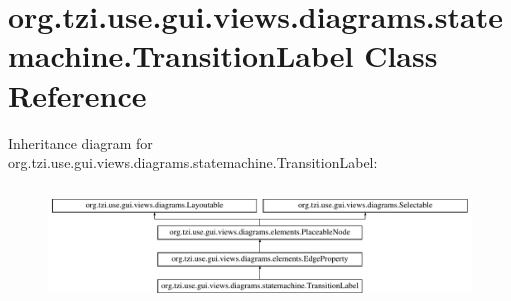 \hypertarget{classorg_1_1tzi_1_1use_1_1gui_1_1views_1_1diagrams_1_1statemachine_1_1_transition_label}{\section{org.\-tzi.\-use.\-gui.\-views.\-diagrams.\-statemachine.\-Transition\-Label Class Reference}
\label{classorg_1_1tzi_1_1use_1_1gui_1_1views_1_1diagrams_1_1statemachine_1_1_transition_label}
}
Inheritance diagram for org.\-tzi.\-use.\-gui.\-views.\-diagrams.\-statemachine.\-Transition\-Label\-:\begin{figure}[H]
\begin{center}
\leavevmode
\includegraphics[height=3.128492cm]{classorg_1_1tzi_1_1use_1_1gui_1_1views_1_1diagrams_1_1statemachine_1_1_transition_label}
\end{center}
\end{figure}

